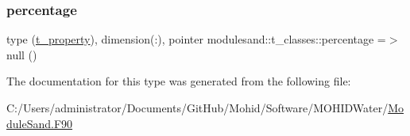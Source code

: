 \subsubsection{\texorpdfstring{percentage}{percentage}}
{\footnotesize\ttfamily type (\mbox{\hyperlink{structmodulesand_1_1t__property}{t\+\_\+property}}), dimension(\+:), pointer modulesand\+::t\+\_\+classes\+::percentage =$>$ null ()\hspace{0.3cm}{\ttfamily [private]}}



The documentation for this type was generated from the following file\+:\begin{DoxyCompactItemize}
\item 
C\+:/\+Users/administrator/\+Documents/\+Git\+Hub/\+Mohid/\+Software/\+M\+O\+H\+I\+D\+Water/\mbox{\hyperlink{_module_sand_8_f90}{Module\+Sand.\+F90}}\end{DoxyCompactItemize}
